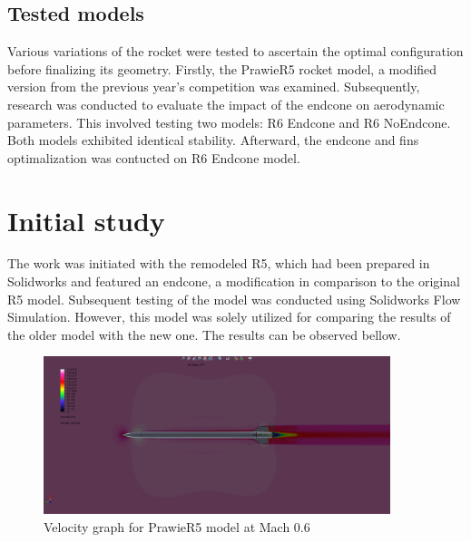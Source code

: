 \documentclass{article}
\begin{document}
\subsection{Tested models}
Various variations of the rocket were tested to ascertain the optimal configuration before 
finalizing its geometry. Firstly, the PrawieR5 rocket model, a modified version from the previous year's competition 
was examined. Subsequently, research was conducted to evaluate the impact of the endcone on 
aerodynamic parameters. This involved testing two models: R6 Endcone and R6 NoEndcone. Both models exhibited identical stability. Afterward, the endcone and fins optimalization
was contucted on R6 Endcone model.


\newpage
\section{Initial study}
The work was initiated with the remodeled R5, which had been prepared in Solidworks 
and featured an endcone, a modification in comparison to the original R5 model. Subsequent 
testing of the model was conducted using Solidworks Flow Simulation. However, this model 
was solely utilized for comparing the results of the older model with the new one. The 
results can be observed bellow.



\begin{figure}[H]
    \centering
    \includegraphics[width=0.9\textwidth]{../data/PrawieR5-Solid/PrawieR5-TR-Velocity-Mach06.png}
    \caption{Velocity graph for PrawieR5 model at Mach 0.6}
\end{figure}
\end{document}
